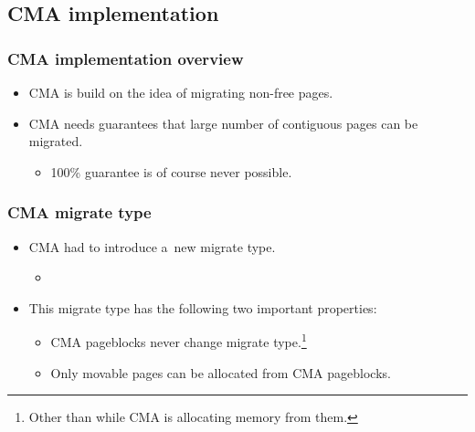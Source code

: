 \subsection{CMA implementation}

\begin{frame}
  \frametitle{CMA implementation overview}

  \begin{itemize}
  \item CMA is build on the idea of migrating non-free pages.
  \item CMA needs guarantees that large number of contiguous pages can
    be migrated.
    \begin{itemize}
    \item 100\% guarantee is of course never possible.
    \end{itemize}
  \end{itemize}
\end{frame}

\begin{frame}[fragile]
  \frametitle{CMA migrate type}

  \begin{itemize}
  \item CMA had to introduce a~new migrate type.
    \begin{itemize}
    \item {}
    \end{itemize}
  \item This migrate type has the following two important properties:
    \begin{itemize}
    \item CMA pageblocks never change migrate type.\footnote{Other
      than while CMA is allocating memory from them.}
    \item Only movable pages can be allocated from CMA pageblocks.
    \end{itemize}
  \end{itemize}
\end{frame}

